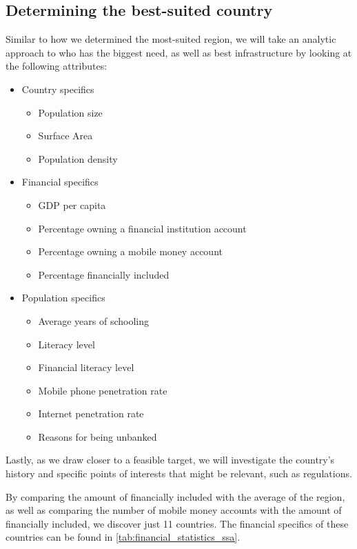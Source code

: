 \documentclass[11pt, a4paper]{article}
\begin{document}
\subsection{Determining the best-suited country} %
\label{sub:determining_the_best_suited_country}
Similar to how we determined the most-suited region, we will take an analytic approach to who has the biggest need, as well as best infrastructure by looking at the following attributes:

\begin{itemize}
  \item Country specifics
  \begin{itemize}
  \item Population size
  \item Surface Area
  \item Population density
  \end{itemize}
  \item Financial specifics
  \begin{itemize}
  \item GDP per capita
  \item Percentage owning a financial institution account
  \item Percentage owning a mobile money account
  \item Percentage financially included
  \end{itemize}
  \item Population specifics
  \begin{itemize}
  \item Average years of schooling
  \item Literacy level
  \item Financial literacy level
  \item Mobile phone penetration rate
  \item Internet penetration rate
  \item Reasons for being unbanked
  \end{itemize}
\end{itemize}
Lastly, as we draw closer to a feasible target, we will investigate the country's history and specific points of interests that might be relevant, such as regulations.

By comparing the amount of financially included with the average of the region, as well as comparing the number of mobile money accounts with the amount of financially included, we discover just 11 countries. The financial specifics of these countries can be found in \autoref{tab:financial_statistics_ssa}.
\end{document}
